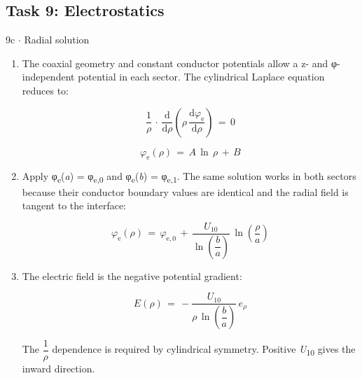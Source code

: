 \documentclass[11pt]{article}
\begin{document}
\begin{keepsection}\subsection{Task 9: Electrostatics}

\begin{workedbox}{9c \ensuremath{\cdot} Radial solution}
\begin{enumerate}
\item {}
The coaxial geometry and constant conductor potentials allow a z- and φ-independent potential in each sector. The cylindrical Laplace equation reduces to:

\begin{equation*}\dfrac{1}{ρ}\, \cdot \, \dfrac{\mathrm{d}}{\mathrm{d}ρ}\left(ρ\, \dfrac{\mathrm{d}φ_{\mathrm{e}}}{\mathrm{d}ρ}\right)\, =\, 0\end{equation*}

\begin{equation*}φ_{\mathrm{e}}(ρ)\, =\, {A}\, \ln \, ρ\, +\, {B}\end{equation*}
\item {}
Apply φ\textsubscript{e}(\textit{a}) = φ\textsubscript{e,0} and φ\textsubscript{e}(\textit{b}) = φ\textsubscript{e,1}. The same solution works in both sectors because their conductor boundary values are identical and the radial field is tangent to the interface:

\begin{equation*}φ_{\mathrm{e}}(ρ)\, =\, φ_{\mathrm{e},0}\, +\, \dfrac{{U}_{10}}{\ln \left(\dfrac{{b}}{{a}}\right)}\, \ln \left(\dfrac{ρ}{{a}}\right)\end{equation*}
\item {}
The electric field is the negative potential gradient:

\begin{equation*}{E}(ρ)\, =\, -\dfrac{{U}_{10}}{ρ\, \ln \left(\dfrac{{b}}{{a}}\right)}\, {e}_{ρ}\end{equation*}

The {\small\ensuremath{\dfrac{1}{{ρ}}}} dependence is required by cylindrical symmetry. Positive \textit{U}\textsubscript{10} gives the inward direction.
\end{enumerate}
\end{workedbox}

\end{keepsection}
\end{document}
